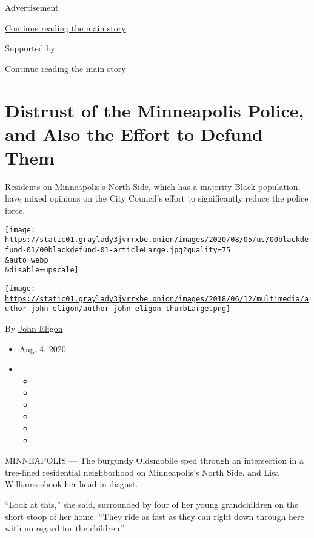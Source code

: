 Advertisement

\protect\hyperlink{after-top}{Continue reading the main story}

Supported by

\protect\hyperlink{after-sponsor}{Continue reading the main story}

\hypertarget{distrust-of-the-minneapolis-police-and-also-the-effort-to-defund-them}{%
\section{Distrust of the Minneapolis Police, and Also the Effort to
Defund
Them}\label{distrust-of-the-minneapolis-police-and-also-the-effort-to-defund-them}}

Residents on Minneapolis's North Side, which has a majority Black
population, have mixed opinions on the City Council's effort to
significantly reduce the police force.

\texttt{[image: https://static01.graylady3jvrrxbe.onion/images/2020/08/05/us/00blackdefund-01/00blackdefund-01-articleLarge.jpg?quality=75\\\&auto=webp\\\&disable=upscale]}

\href{https://www.nytimes3xbfgragh.onion/by/john-eligon}{\texttt{[image: https://static01.graylady3jvrrxbe.onion/images/2018/06/12/multimedia/author-john-eligon/author-john-eligon-thumbLarge.png]}}

By \href{https://www.nytimes3xbfgragh.onion/by/john-eligon}{John Eligon}

\begin{itemize}
\item
  Aug. 4, 2020
\item
  \begin{itemize}
  \item
  \item
  \item
  \item
  \item
  \item
  \end{itemize}
\end{itemize}

MINNEAPOLIS --- The burgundy Oldsmobile sped through an intersection in
a tree-lined residential neighborhood on Minneapolis's North Side, and
Lisa Williams shook her head in disgust.

``Look at this,'' she said, surrounded by four of her young
grandchildren on the short stoop of her home. ``They ride as fast as
they can right down through here with no regard for the children.''

